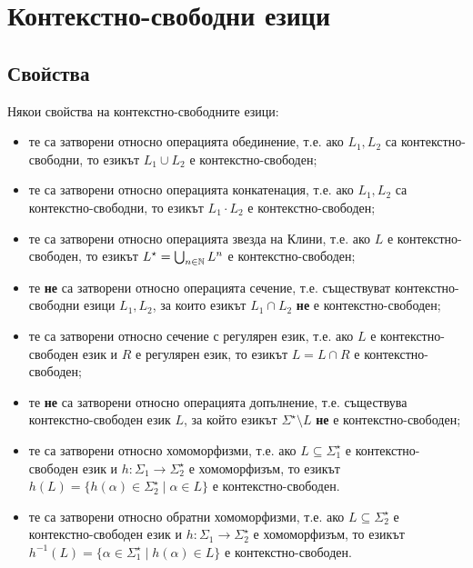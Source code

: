 
\chapter{Контекстно-свободни езици}

\section{Свойства}

Някои свойства на контекстно-свободните езици:
\begin{itemize}
\item 
  те са затворени относно операцията обединение, т.е.
  ако $L_1, L_2$ са контекстно-свободни, то езикът $L_1 \cup L_2$ е контекстно-свободен; 
\item
  те са затворени относно операцията конкатенация, т.е.
  ако $L_1, L_2$ са контекстно-свободни, то езикът $L_1 \cdot L_2$ е контекстно-свободен; 
\item
  те са затворени относно операцията звезда на Клини, т.е.
  ако $L$ е контекстно-свободен, то езикът $L^\star = \bigcup_{n\in\mathbb{N}} L^n$ е контекстно-свободен; 
\item
  те {\bf не} са затворени относно операцията сечение, т.е.
  съществуват контекстно-свободни езици $L_1, L_2$, за които езикът $L_1 \cap L_2$ {\bf не} е контекстно-свободен; 
\item
  те са затворени относно сечение с регулярен език, т.е.
  ако $L$ е контекстно-свободен език и $R$ е регулярен език, то езикът $L = L \cap R$ е контекстно-свободен; 
\item
  те {\bf не} са затворени относно операцията допълнение, т.е.
  съществува контекстно-свободен език $L$, за който езикът $\Sigma^\star\setminus L$ {\bf не} е контекстно-свободен; 
\item
  те са затворени относно хомоморфизми, т.е.
  ако $L \subseteq \Sigma^\star_1$ е контекстно-свободен език и $h:\Sigma_1\to\Sigma^\star_2$ е хомоморфизъм, 
  то езикът $h(L) = \{h(\alpha) \in \Sigma^\star_2 \mid \alpha \in L\}$
  е контекстно-свободен.
\item
  те са затворени относно обратни хомоморфизми, т.е.
  ако $L\subseteq \Sigma^\star_2$ е контекстно-свободен език и $h:\Sigma_1\to\Sigma^\star_2$ е хомоморфизъм, 
  то езикът $h^{-1}(L) = \{\alpha \in \Sigma^\star_1 \mid h(\alpha) \in L\}$
  е контекстно-свободен.
\end{itemize}

